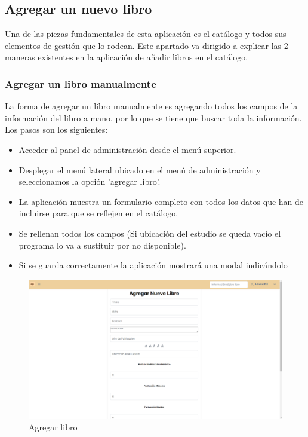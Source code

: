 \FloatBarrier

\subsection{Agregar un nuevo libro}
Una de las piezas fundamentales de esta aplicación es el catálogo y todos sus elementos de gestión que lo rodean. Este apartado va dirigido a explicar las 2 maneras existentes en la aplicación de añadir libros en el catálogo.

\subsubsection{Agregar un libro manualmente}
La forma de agregar un libro manualmente es agregando todos los campos de la información del libro a mano, por lo que se tiene que buscar toda la información.
Los pasos son los siguientes:
\begin{itemize}
    \item Acceder al panel de administración desde el menú superior.
    \item Desplegar el menú lateral ubicado en el menú de administración y seleccionamos la opción 'agregar libro'.
    \item La aplicación muestra un formulario completo con todos los datos que han de incluirse para que se reflejen en el catálogo.
    \item Se rellenan todos los campos (Si ubicación del estudio se queda vacío el programa lo va a sustituir por no disponible).
    \item Si se guarda correctamente la aplicación mostrará una modal indicándolo
\end{itemize}
\begin{figure}
    \centering
    \includegraphics[width=1\linewidth]{Imagenes/ManualAgregar.png}
    \caption{Agregar libro}
    \label{Agregar libro}
\end{figure}

